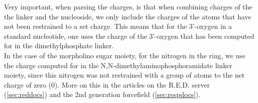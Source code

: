 \documentclass[a4paper]{article}
\begin{document}
%
\vspace{3mm}
Very important, when parsing the charges, is that when combining charges of the the linker and the nucleoside, we only include the charges of the atoms that have not been restrained to a set charge. This means that for the 3'-oxygen in a standard nucleotide, one uses the charge of the 3'-oxygen that has been computed for in the dimethylphosphate linker.\\
In the case of the morpholino sugar moiety, for the nitrogen in the ring, we use the charge computed for in the N,N-dimethylaminophosphoramidate linker moiety, since this nitrogen was not restrained with a group of atoms to the net charge of zero (0). More on this in the articles on the R.E.D. server (\ref{sec:reddocs}) and the 2nd generation forcefield (\ref{sec:respdocs}).

%
%
%
%
%
%
%
%
%
%
%
%
%
%
\pagebreak
\end{document}
